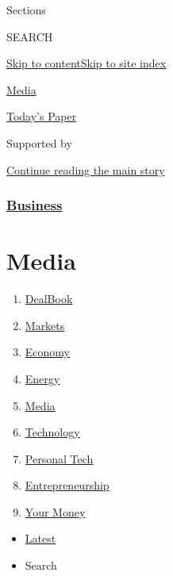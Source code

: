 Sections

SEARCH

\protect\hyperlink{site-content}{Skip to
content}\protect\hyperlink{site-index}{Skip to site index}

\href{https://www.nytimes3xbfgragh.onion/pages/business/media/index.html}{Media}

\href{https://myaccount.nytimes3xbfgragh.onion/auth/login?response_type=cookie\&client_id=vi}{}

\href{https://www.nytimes3xbfgragh.onion/section/todayspaper}{Today's
Paper}

Supported by

\protect\hyperlink{after-sponsor}{Continue reading the main story}

\hypertarget{business}{%
\subsubsection{\texorpdfstring{\href{/section/business}{Business}}{Business}}\label{business}}

\hypertarget{media}{%
\section{Media}\label{media}}

\begin{enumerate}
\def\labelenumi{\arabic{enumi}.}
\tightlist
\item
  \href{/pages/business/dealbook/index.html}{DealBook}
\item
  \href{https://markets.on.nytimes3xbfgragh.onion}{Markets}
\item
  \href{/section/business/economy}{Economy}
\item
  \href{/section/business/energy-environment}{Energy}
\item
  \href{/section/business/media}{Media}
\item
  \href{/section/technology}{Technology}
\item
  \href{/section/technology/personaltech}{Personal Tech}
\item
  \href{/section/business/smallbusiness}{Entrepreneurship}
\item
  \href{/section/your-money}{Your Money}
\end{enumerate}

\begin{itemize}
\tightlist
\item
  \protect\hyperlink{stream-panel}{Latest}
\item
  Search
\end{itemize}

